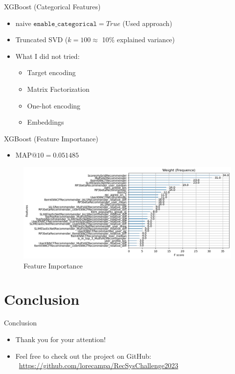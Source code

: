\documentclass{beamer}
\begin{document}
\begin{frame}{XGBoost (Categorical Features)}
  \begin{itemize}
    \item naive $\texttt{enable\_categorical}=True$ (Used approach)
    \item Truncated SVD ($k=100 \approx$ 10\% explained variance)
    \item What I did not tried:
    \begin{itemize}
      \item Target encoding
      \item Matrix Factorization
      \item One-hot encoding
      \item Embeddings
    \end{itemize}
  \end{itemize}
\end{frame}

\begin{frame}{XGBoost (Feature Importance)}
  \begin{itemize}
    \item $\text{MAP@}10=0.051485$
  \end{itemize}
  \begin{figure}
    \centering
    \includegraphics[width=1\textwidth]{feature_importance.png}
    \caption{Feature Importance}
  \end{figure}
\end{frame}


\section{Conclusion}

\begin{frame}{Conclusion}
\begin{itemize}
    \item Thank you for your attention!
    \item Feel free to check out the project on GitHub: \\
    \faGithub\ \url{https://github.com/lorecampa/RecSysChallenge2023}
\end{itemize}
\end{frame}
\end{document}
